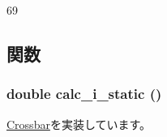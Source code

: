 \begin{DoxyCode}
69 {}
\end{DoxyCode}


\subsection{関数}
\hypertarget{classMatrixCrossbar_a0027807356ac4ca07fe2e593234eb884}{
\subsubsection[{calc\_\-i\_\-static}]{\setlength{\rightskip}{0pt plus 5cm}double calc\_\-i\_\-static ()}}
\label{classMatrixCrossbar_a0027807356ac4ca07fe2e593234eb884}


\hyperlink{classCrossbar_a231bfef1332fc2583c9120c237648492}{Crossbar}を実装しています。


